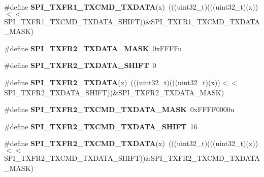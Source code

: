 \begin{DoxyCompactItemize}
\item 
\#define {\bfseries S\+P\+I\+\_\+\+T\+X\+F\+R1\+\_\+\+T\+X\+C\+M\+D\+\_\+\+T\+X\+D\+A\+TA}(x)~(((uint32\+\_\+t)(((uint32\+\_\+t)(x))$<$$<$S\+P\+I\+\_\+\+T\+X\+F\+R1\+\_\+\+T\+X\+C\+M\+D\+\_\+\+T\+X\+D\+A\+T\+A\+\_\+\+S\+H\+I\+FT))\&S\+P\+I\+\_\+\+T\+X\+F\+R1\+\_\+\+T\+X\+C\+M\+D\+\_\+\+T\+X\+D\+A\+T\+A\+\_\+\+M\+A\+SK)\hypertarget{group__SPI__Register__Masks_ga7aee126ae71c905a5041e9313be0bbea}{}\label{group__SPI__Register__Masks_ga7aee126ae71c905a5041e9313be0bbea}

\item 
\#define {\bfseries S\+P\+I\+\_\+\+T\+X\+F\+R2\+\_\+\+T\+X\+D\+A\+T\+A\+\_\+\+M\+A\+SK}~0x\+F\+F\+F\+Fu\hypertarget{group__SPI__Register__Masks_ga5af82cbc997e329e1c914390f4a46ddf}{}\label{group__SPI__Register__Masks_ga5af82cbc997e329e1c914390f4a46ddf}

\item 
\#define {\bfseries S\+P\+I\+\_\+\+T\+X\+F\+R2\+\_\+\+T\+X\+D\+A\+T\+A\+\_\+\+S\+H\+I\+FT}~0\hypertarget{group__SPI__Register__Masks_ga563b2a2513ee7f9ba76d56405bfaa053}{}\label{group__SPI__Register__Masks_ga563b2a2513ee7f9ba76d56405bfaa053}

\item 
\#define {\bfseries S\+P\+I\+\_\+\+T\+X\+F\+R2\+\_\+\+T\+X\+D\+A\+TA}(x)~(((uint32\+\_\+t)(((uint32\+\_\+t)(x))$<$$<$S\+P\+I\+\_\+\+T\+X\+F\+R2\+\_\+\+T\+X\+D\+A\+T\+A\+\_\+\+S\+H\+I\+FT))\&S\+P\+I\+\_\+\+T\+X\+F\+R2\+\_\+\+T\+X\+D\+A\+T\+A\+\_\+\+M\+A\+SK)\hypertarget{group__SPI__Register__Masks_ga250949668a77db2805371541e9bb8e16}{}\label{group__SPI__Register__Masks_ga250949668a77db2805371541e9bb8e16}

\item 
\#define {\bfseries S\+P\+I\+\_\+\+T\+X\+F\+R2\+\_\+\+T\+X\+C\+M\+D\+\_\+\+T\+X\+D\+A\+T\+A\+\_\+\+M\+A\+SK}~0x\+F\+F\+F\+F0000u\hypertarget{group__SPI__Register__Masks_ga7b74d7b06c2d79ce4f3f5171e63a66f6}{}\label{group__SPI__Register__Masks_ga7b74d7b06c2d79ce4f3f5171e63a66f6}

\item 
\#define {\bfseries S\+P\+I\+\_\+\+T\+X\+F\+R2\+\_\+\+T\+X\+C\+M\+D\+\_\+\+T\+X\+D\+A\+T\+A\+\_\+\+S\+H\+I\+FT}~16\hypertarget{group__SPI__Register__Masks_ga8093c55dfe44be309ef0286209361f0e}{}\label{group__SPI__Register__Masks_ga8093c55dfe44be309ef0286209361f0e}

\item 
\#define {\bfseries S\+P\+I\+\_\+\+T\+X\+F\+R2\+\_\+\+T\+X\+C\+M\+D\+\_\+\+T\+X\+D\+A\+TA}(x)~(((uint32\+\_\+t)(((uint32\+\_\+t)(x))$<$$<$S\+P\+I\+\_\+\+T\+X\+F\+R2\+\_\+\+T\+X\+C\+M\+D\+\_\+\+T\+X\+D\+A\+T\+A\+\_\+\+S\+H\+I\+FT))\&S\+P\+I\+\_\+\+T\+X\+F\+R2\+\_\+\+T\+X\+C\+M\+D\+\_\+\+T\+X\+D\+A\+T\+A\+\_\+\+M\+A\+SK)\hypertarget{group__SPI__Register__Masks_ga75b102ae2a2b880227933ea731c97323}{}\label{group__SPI__Register__Masks_ga75b102ae2a2b880227933ea731c97323}


\end{DoxyCompactItemize}
